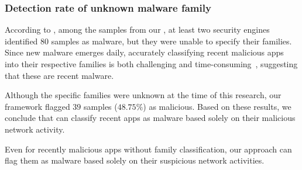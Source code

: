 \subsubsection{Detection rate of unknown malware family}\label{sec:unknowfamily}

According to \vt, among the samples from our \fds, at least two security engines identified $80$ samples as malware, but they were unable to specify their families. Since new malware emerges daily, accurately classifying recent malicious apps into their respective families is both challenging and time-consuming~\cite{DBLP:journals/compsec/WangTW21,DBLP:journals/compsec/ContiKP22}, suggesting that these are recent malware.

Although the specific families were unknown at the time of this research, our framework flagged $39$ samples ($48.75\%$) as malicious. Based on these results, we conclude that \droidxpflow can classify recent apps as malware based solely on their malicious network activity.

\begin{finding}

Even for recently malicious apps without family classification, our approach can flag them as malware based solely on their suspicious network activities.

\end{finding}







